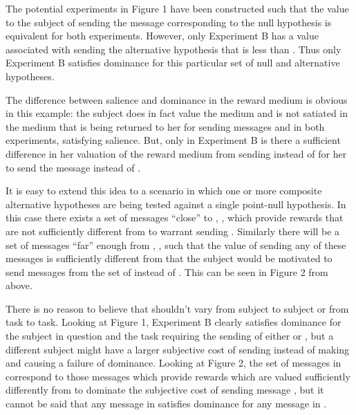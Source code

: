 \documentclass[../main.tex]{subfiles}
\begin{document}
The potential experiments in Figure 1 have been constructed such that the value to the subject of sending the message corresponding to the null hypothesis is equivalent for both experiments.
However, only Experiment B has a value associated with sending the alternative hypothesis that is less than .
Thus only Experiment B satisfies dominance for this particular set of null and alternative hypotheses.

The difference between salience and dominance in the reward medium is obvious in this example: the subject does in fact value the medium and is not satiated in the medium that is being returned to her for sending messages  and  in both experiments, satisfying salience.
But, only in Experiment B is there a sufficient difference in her valuation of the reward medium from sending  instead of   for her to send the message  instead of .


It is easy to extend this idea to a scenario in which one or more composite alternative hypotheses are being tested against a single point-null hypothesis.
In this case there exists a set of messages \enquote{close} to , , which provide rewards that are not sufficiently different from  to warrant sending .
Similarly there will be a set of messages \enquote{far} enough from , , such that the value of sending any of these messages is sufficiently different from  that the subject would be motivated to send messages from the set of  instead of .
This can be seen in Figure 2 from \textcite{Harrison1992} above.

There is no reason to believe that  shouldn't vary from subject to subject or from task to task.
Looking at Figure 1, Experiment B clearly satisfies dominance for the subject in question and the task requiring the sending of either  or , but a different subject might have a larger subjective cost of sending  instead of  making  and causing a failure of dominance.
Looking at Figure 2, the set of messages in  correspond to those messages which provide rewards which are valued sufficiently differently from  to dominate the subjective cost of sending message , but it cannot be said that any message in  satisfies dominance for any message in .
\end{document}

